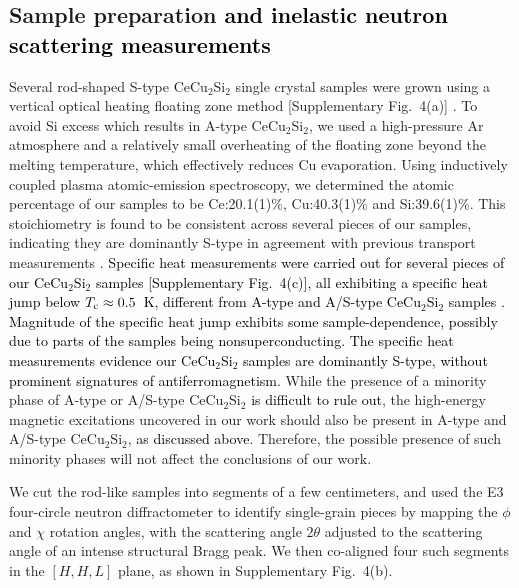 \documentclass[aps,prl,onecolumn,amsmath,amssymb,superscriptaddress]{revtex4}
\newcommand{\ys}{\textcolor{black}}
\newcommand{\yy}{\textcolor{black}}
\begin{document}
\subsection{Sample preparation \yy{and inelastic neutron scattering measurements}}
Several rod-shaped S-type CeCu$_2$Si$_2$ single crystal samples were grown using a vertical optical heating floating zone method [Supplementary Fig.~4(a)] \cite{CCao2011}. To avoid Si excess which results in A-type CeCu$_2$Si$_2$, we used a high-pressure Ar atmosphere and a relatively small overheating of the floating zone beyond the melting temperature, which effectively reduces Cu evaporation. Using inductively coupled plasma atomic-emission spectroscopy, we determined the atomic percentage of our samples to be Ce:20.1(1)\%, Cu:40.3(1)\% and Si:39.6(1)\%. This stoichiometry is found to be consistent across several pieces of our samples, indicating they are dominantly S-type \cite{FSteglich1996} in agreement with previous transport measurements \cite{CCao2011}. \ys{Specific heat measurements were carried out for several pieces of our CeCu$_2$Si$_2$ samples [Supplementary Fig.~4(c)], all exhibiting a specific heat jump below $T_{\rm c}\approx0.5$~K, different from A-type and A/S-type CeCu$_2$Si$_2$ samples \cite{OStockert2004,ELengyel2011}. Magnitude of the specific heat jump exhibits some sample-dependence, possibly due to parts of the samples being nonsuperconducting. The specific heat measurements evidence our CeCu$_2$Si$_2$ samples are dominantly S-type, without prominent signatures of antiferromagnetism.} While the presence of a minority phase of A-type or A/S-type CeCu$_2$Si$_2$ \ys{is difficult to rule out}, the high-energy magnetic excitations uncovered in our work should also be present in A-type and A/S-type CeCu$_2$Si$_2$, \ys{as discussed above}. Therefore, the possible presence of such minority phases will not affect the conclusions of our work. 

We cut the rod-like samples into segments of a few centimeters, and used the E3 four-circle neutron diffractometer to identify single-grain pieces by mapping the $\phi$ and $\chi$ rotation angles, with the scattering angle $2\theta$ adjusted to the scattering angle of an intense structural Bragg peak. We then co-aligned four such segments in the $[H,H,L]$ plane, as shown in Supplementary Fig.~4(b).
\end{document}
